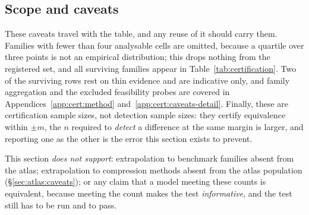 \subsection{Scope and caveats}
\label{sec:cert:caveats}

These caveats travel with the table, and any reuse of it should carry them.
Families with fewer than four analysable cells are omitted, because a quartile
over three points is not an empirical distribution; this drops nothing from the
registered set, and all surviving families appear in
Table~\ref{tab:certification}. Two of the surviving rows rest on thin evidence
and are indicative only, and family aggregation and the excluded feasibility
probes are covered in Appendices~\ref{app:cert:method}
and~\ref{app:cert:caveats-detail}. Finally, these are certification sample
sizes, not detection sample sizes: they certify equivalence within $\pm m$, the
$n$ required to \emph{detect} a difference at the same margin is larger, and
reporting one as the other is the error this section exists to prevent.

This section \emph{does not support}: extrapolation to benchmark families
absent from the atlas; extrapolation to compression methods absent from the
atlas population (\S\ref{sec:atlas:caveats}); or any claim that a model meeting
these counts is equivalent, because meeting the count makes the test
\emph{informative}, and the test still has to be run and to pass.
